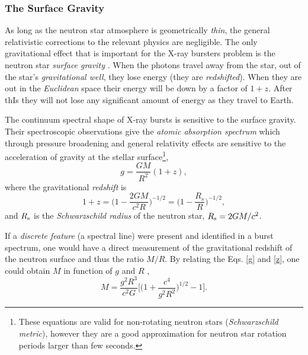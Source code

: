 {\quad



\subsubsection*{The Surface Gravity}\label{sz}

As long as the neutron star atmosphere is geometrically {\it thin}, the general relativistic corrections to the relevant physics are negligible. The only gravitational effect that is important for the X-ray bursters problem is the neutron star {\it surface  gravity} \cite{MAD04}. When the photons travel away from the star, out of the star's {\it gravitational well}, they lose energy (\ie they are {\it redshifted}). When they are out in the {\it Euclidean} space their energy will be down by a factor of $1+z$. After thIs they will not lose any significant amount of energy as they travel to Earth.

\quad

The continuum spectral shape of X-ray bursts is sensitive to the  surface gravity. Their spectroscopic observations give the {\it atomic absorption spectrum} which through pressure broadening and general relativity effects are sensitive to  the  acceleration of  gravity at the stellar surface\footnote{These equations are valid for non-rotating neutron stars ({\it Schwarzschild metric}), however they are a good approximation for neutron star rotation periods larger than few seconds.},
\begin{equation}
g = \frac{GM}{R^2} (1 +z),
\label{g}
\end{equation}
 where the gravitational {\it redshift} is
\begin{equation}
 1 +z = \Bigg(1- \frac{2GM}{c^2R} \Bigg)^{-1/2} = \Bigg( 1 - \frac{R_s}{R} \Bigg)^{-1/2},
\label{z}
\end{equation} 
 and $R_{\rm s}$ is the {\it Schwarzschild radius} of the neutron star, $R_{\rm s} = 2GM/c^2$.

\quad


If a {\it discrete feature} (a spectral line) were present and identified in a burst spectrum, one would have a direct measurement of the gravitational redshift of the neutron surface and thus the ratio $M/R$. By relating the Eqs. \ref{g} and \ref{z}, one could obtain $M$ in function of $g$ and $R$ \cite{LM07} \cite{MAD04},
\begin{equation}
M= \frac{g^2R^3}{c^2G}\Bigg[\Big(1 + \frac{c^4}{g^2R^2}\Big)^{1/2} -1 \Bigg].
\label{m3}
\end{equation}

}
